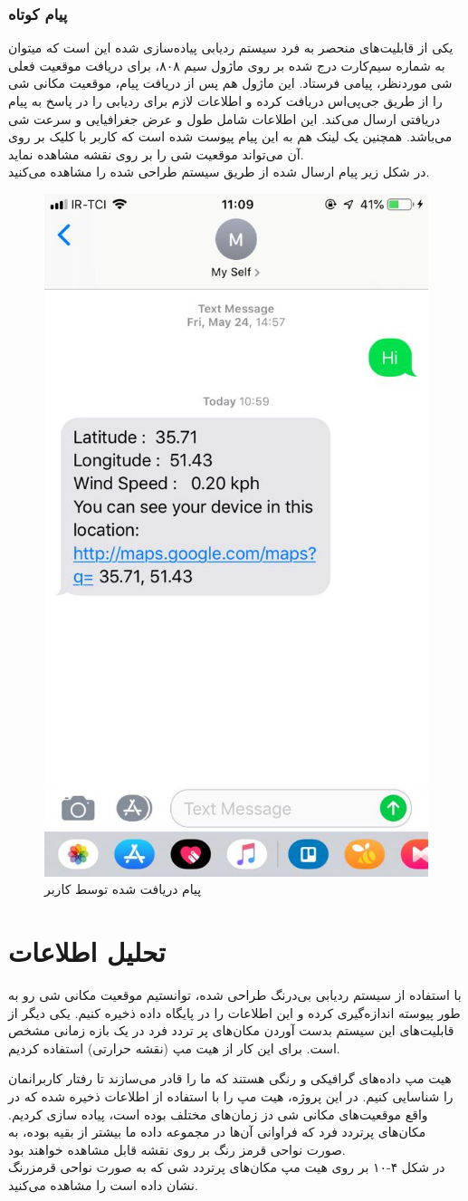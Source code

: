  \subsubsection{پیام کوتاه}
 یکی از قابلیت‌های منحصر به فرد سیستم ردیابی پیاده‌سازی شده این است که میتوان به شماره سیم‌کارت درج شده بر روی ماژول سیم ۸۰۸، برای دریافت موقعیت فعلی شی موردنظر، پیامی فرستاد. این ماژول هم پس از دریافت پیام، موقعیت مکانی شی را از طریق جی‌پی‌اس دریافت کرده و اطلاعات لازم برای ردیابی را در پاسخ به پیام دریافتی ارسال می‌کند. این اطلاعات شامل طول و عرض جغرافیایی و سرعت شی می‌باشد. همچنین یک لینک هم به این پیام پیوست شده است که کاربر با کلیک بر روی آن می‌تواند موقعیت شی را بر روی نقشه مشاهده نماید.\\
 در شکل زیر پیام ارسال شده از طریق سیستم طراحی شده را مشاهده می‌کنید.\\
 
 \begin{figure}[!h]
 	\centerline{\includegraphics[width=.4\textwidth]{sms}}
 	\caption{پیام دریافت شده توسط کاربر}
 \end{figure}
\newpage
\section{تحلیل اطلاعات} 
با استفاده از سیستم ردیابی بی‌درنگ طراحی شده، توانستیم موقعیت مکانی شی رو به طور پیوسته اندازه‌گیری کرده و این اطلاعات را در پایگاه داده ذخیره کنیم.
یکی دیگر از قابلیت‌های این سیستم بدست آوردن مکان‌های پر تردد فرد در یک بازه زمانی مشخص است. برای این کار از هیت مپ (نقشه حرارتی) استفاده کردیم.


هیت مپ داده‌های گرافیکی و رنگی هستند که ما را قادر می‌سازند تا رفتار کاربرانمان را شناسایی کنیم. در این پروژه، هیت مپ را با استفاده از اطلاعات ذخیره شده که در واقع موقعیت‌های مکانی شی دز زمان‌های مختلف بوده است، پیاده سازی کردیم. مکان‌های پرتردد فرد که فراوانی آن‌ها در مجموعه داده ما بیشتر از بقیه بوده، به صورت نواحی قرمز رنگ بر روی نقشه قابل مشاهده خواهند بود.\\
در شکل ۴-۱۰ بر روی هیت مپ مکان‌های پرتردد شی که به صورت نواحی قرمزرنگ نشان داده است را مشاهده می‌کنید.\\

